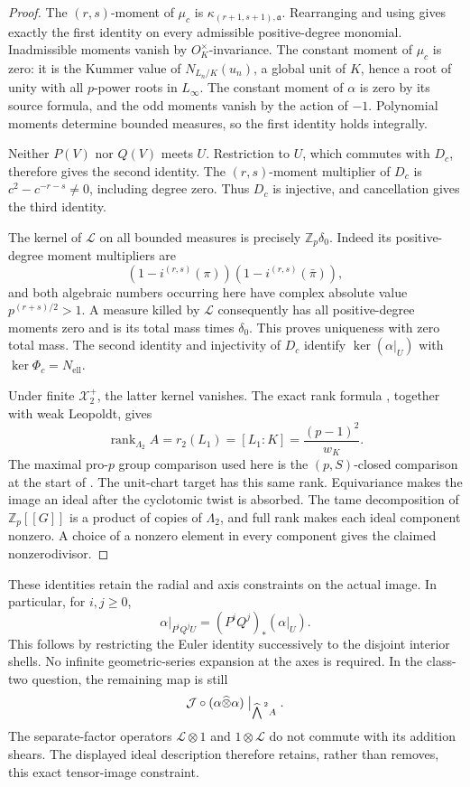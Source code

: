 \documentclass[11pt]{article}
\theoremstyle{definition}\newtheorem{definition}[theorem]{Definition}
\begin{document}
\begin{proof}
The \((r,s)\)-moment of \(\mu_c\) is
\(\kappa_{(r+1,s+1),\mathfrak a}\).  Rearranging
\cite[Proposition 4.3, pp.~17--18]{IshiiSoule}
and using \cite[Theorem 2.6, p.~8]{Ishii}
gives exactly the first identity on every admissible
positive-degree monomial.  Inadmissible moments
vanish by \(O_K^\times\)-invariance.  The constant
moment of \(\mu_c\) is zero: it is the Kummer value
of \(N_{L_n/K}(u_n)\), a global unit of \(K\), hence
a root of unity with all \(p\)-power roots in
\(L_\infty\).  The constant moment of \(\alpha\)
is zero by its source formula, and the odd moments
vanish by the action of \(-1\).
Polynomial moments determine bounded measures,
so the first identity holds integrally.

Neither \(P(V)\) nor \(Q(V)\) meets \(U\).
Restriction to \(U\), which commutes with \(D_c\),
therefore gives the second identity.
The \((r,s)\)-moment multiplier of \(D_c\) is
\(c^2-c^{-r-s}\ne0\), including degree zero.
Thus \(D_c\) is injective, and cancellation gives
the third identity.

The kernel of \(\mathcal L\) on all bounded
measures is precisely \(\mathbb Z_p\delta_0\).
Indeed its positive-degree moment multipliers
are
\[
 (1-i^{(r,s)}(\pi))(1-i^{(r,s)}(\bar\pi)),
\]
and both algebraic numbers occurring here have
complex absolute value \(p^{(r+s)/2}>1\).
A measure killed by \(\mathcal L\) consequently
has all positive-degree moments zero and is its
total mass times \(\delta_0\).
This proves uniqueness with zero total mass.
The second identity and injectivity of \(D_c\)
identify \(\ker(\alpha|_U)\) with
\(\ker\Phi_c=N_{\mathrm{ell}}\).

Under finite \(\mathcal X_2^+\), the latter kernel
vanishes.  The exact rank formula
\cite[Theorem 4.4, author version p.~27]{VenjakobIwasawa},
together with weak Leopoldt, gives
\[
 \operatorname{rank}_{\Lambda_2}A
     =r_2(L_1)=[L_1:K]=\frac{(p-1)^2}{w_K}.
\]
The maximal pro-\(p\) group comparison used here
is the \((p,S)\)-closed comparison at the start of
\cite[Section 4, author version p.~26]{VenjakobIwasawa}.
The unit-chart target has this same rank.
Equivariance makes the image an ideal after the
cyclotomic twist is absorbed.  The tame
decomposition of \(\mathbb Z_p[[G]]\) is a product
of copies of \(\Lambda_2\), and full rank makes
each ideal component nonzero.  A choice of a
nonzero element in every component gives the
claimed nonzerodivisor.
\end{proof}

These identities retain the radial and axis constraints
on the actual image.  In particular, for \(i,j\geq0\),
\[
 \alpha|_{P^iQ^jU}=(P^iQ^j)_*(\alpha|_U).
\]
This follows by restricting the Euler identity
successively to the disjoint interior shells.
No infinite geometric-series expansion at the axes
is required.  In the class-two question, the remaining
map is still
\[
 \mathcal J\circ(\alpha\widehat\otimes\alpha)
              \bigm|_{\widehat{\bigwedge}^{\,2}A}.
\]
The separate-factor operators \(\mathcal L\otimes1\)
and \(1\otimes\mathcal L\) do not commute with its
addition shears.  The displayed ideal description
therefore retains, rather than removes, this exact
tensor-image constraint.
\end{document}
